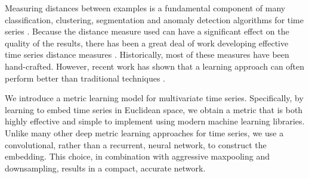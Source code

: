 

Measuring distances between examples is a fundamental component of many classification, clustering, segmentation and anomaly detection algorithms for time series \citep{ucrSuite,shotgunDistance,dtwClustering,dtwClusteringWarp}. Because the distance measure used can have a significant effect on the quality of the results, there has been a great deal of work developing effective time series distance measures \citep{weightedDTW,tsDiscord, bakeoff2016,dtwClustering, tsBakeoff2008}. Historically, most of these measures have been hand-crafted. However, recent work has shown that a learning approach can often perform better than traditional techniques \citep{multimodalMetric,mddtw,decade}.


We introduce a metric learning model for multivariate time series. Specifically, by learning to embed time series in Euclidean space, we obtain a metric that is both highly effective and simple to implement using modern machine learning libraries. Unlike many other deep metric learning approaches for time series, we use a convolutional, rather than a recurrent, neural network, to construct the embedding. This choice, in combination with aggressive maxpooling and downsampling, results in a compact, accurate network. %


